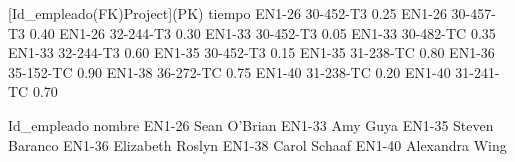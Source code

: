 [Id_empleado(FK)Project](PK)	    tiempo
EN1-26     30-452-T3                       0.25
EN1-26     30-457-T3                       0.40
EN1-26     32-244-T3                       0.30
EN1-33     30-452-T3                       0.05
EN1-33     30-482-TC                       0.35
EN1-33     32-244-T3                       0.60
EN1-35     30-452-T3                       0.15
EN1-35     31-238-TC                       0.80
EN1-36     35-152-TC                       0.90
EN1-38     36-272-TC                       0.75
EN1-40     31-238-TC                       0.20
EN1-40     31-241-TC                       0.70

Id_empleado           nombre
EN1-26                   Sean O’Brian
EN1-33                   Amy Guya
EN1-35                   Steven Baranco
EN1-36                   Elizabeth Roslyn
EN1-38                   Carol Schaaf
EN1-40                   Alexandra Wing

